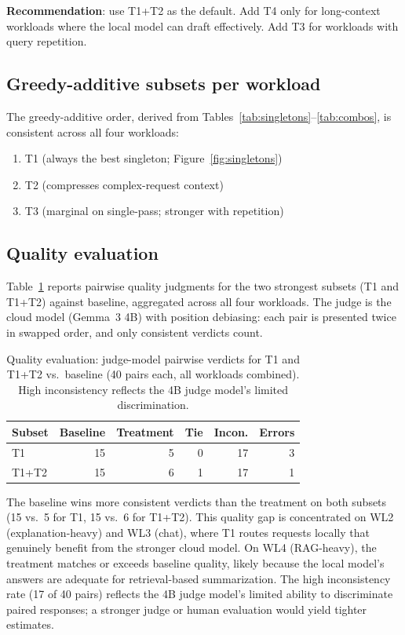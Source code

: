 \documentclass[11pt,a4paper]{article}
\begin{document}
\textbf{Recommendation}: use T1+T2 as the default. Add T4 only for
long-context workloads where the local model can draft effectively.
Add T3 for workloads with query repetition.

\subsection{Greedy-additive subsets per workload}

The greedy-additive order, derived from
Tables~\ref{tab:singletons}--\ref{tab:combos}, is consistent across all
four workloads:
\begin{enumerate}
  \item T1 (always the best singleton; Figure~\ref{fig:singletons})
  \item T2 (compresses complex-request context)
  \item T3 (marginal on single-pass; stronger with repetition)
\end{enumerate}

\subsection{Quality evaluation}

Table~\ref{tab:quality} reports pairwise quality judgments for the two
strongest subsets (T1 and T1+T2) against baseline, aggregated across
all four workloads. The judge is the cloud model (Gemma~3 4B) with
position debiasing: each pair is presented twice in swapped order, and
only consistent verdicts count.

\begin{table}[h]
\centering
\caption{Quality evaluation: judge-model pairwise verdicts for T1 and
  T1+T2 vs.\ baseline (40 pairs each, all workloads combined). High
  inconsistency reflects the 4B judge model's limited discrimination.}
\label{tab:quality}
\begin{tabular}{l r r r r r}
\toprule
Subset & Baseline & Treatment & Tie & Incon. & Errors \\
\midrule
T1      & 15 & 5 & 0 & 17 & 3 \\
T1+T2   & 15 & 6 & 1 & 17 & 1 \\
\bottomrule
\end{tabular}
\end{table}

The baseline wins more consistent verdicts than the treatment on both
subsets (15 vs.\ 5 for T1, 15 vs.\ 6 for T1+T2). This quality gap is
concentrated on WL2 (explanation-heavy) and WL3 (chat), where T1 routes
requests locally that genuinely benefit from the stronger cloud model.
On WL4 (RAG-heavy), the treatment matches or exceeds baseline quality,
likely because the local model's answers are adequate for
retrieval-based summarization. The high inconsistency rate (17 of 40
pairs) reflects the 4B judge model's limited ability to discriminate
paired responses; a stronger judge or human evaluation would yield
tighter estimates.
\end{document}
